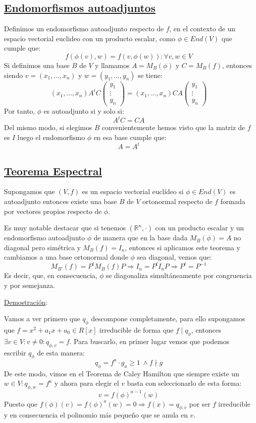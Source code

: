 \documentclass[10pt,a4paper,openright]{book}
\begin{document}
\subsection*{\underline{Endomorfismos autoadjuntos}}
Definimos un endomorfismo autoadjunto respecto de $f$, en el contexto de un espacio vectorial euclideo con un producto escalar, como $\phi\in End(V)$ que cumple que:
$$f(\phi(v),w) = f(v,\phi(w)): \forall v,w\in V$$
Si definimos una base $B$ de $V$ y llamamos $A=M_B(\phi)$ y $C=M_B(f)$, entonces siendo $v=(x_1, ..., x_n)$ y $w=(y_1, ..., y_n)$ se tiene:
$$(x_1, ..., x_n) A^tC \begin{pmatrix} y_1 \\ \vdots \\ y_n\end{pmatrix} = (x_1, ..., x_n)CA\begin{pmatrix} y_1 \\ \vdots \\ y_n\end{pmatrix}$$
Por tanto, $\phi$ es autoadjunto si y solo si:
$$A^tC=CA$$
Del mismo modo, si elegimos $B$ convenientemente hemos visto que la matriz de $f$ es $I$ luego el endomorfismo $\phi$ en esa base cumple que:
$$A=A^t$$

\subsection*{\underline{Teorema Espectral}}
Supongamos que $(V,f)$ es un espacio vectorial euclídeo si $\phi\in End(V)$ es autoadjunto entonces existe una base $B$ de $V$ ortonormal respecto de $f$ formada por vectores propios respecto de $\phi$.

Es muy notable destacar que si tenemos $(\mathbb R^n, \cdot)$ con un producto escalar y un endomorfismo autoadjunto $\phi$ de manera que en la base dada $M_B(\phi) = A$ no diagonal pero simétrica y $M_B(f) = I_n$, entonces si aplicamos este teorema y cambiamos a una base ortonormal donde $\phi$ sea diagonal, vemos que:
$$M_{B'}(f) = P^t M_B(f) P \Rightarrow I_n = P^t I_n P\Rightarrow P^t =P^{-1}$$
Es decir, que, en consecuencia, $\phi$ se diagonaliza simultáneamente por congruencia y por semejanza.

\underline{Demostración}:

Vamos a ver primero que $q_\phi$ descompone completamente, para ello supongamos que $f = x^2+a_1x+a_0\in R[x]$ irreducible de forma que $f\mid q_\phi$, entonces $\exists v\in V: v\neq 0: q_{\phi,v} = f$. Para buscarlo, en primer lugar vemos que podemos escribir $q_\phi$ de esta manera:
$$q_\phi = f^a \cdot g_ a\geq 1 \ \wedge f\nmid g$$
De este modo, vimos en el Teorema de Caley Hamilton que siempre existe un $w\in V: q_{\phi, w} = f^a$ y ahora para elegir el $v$ basta con seleccionarlo de esta forma:
$$v= f(\phi)^{a-1}(w)$$
Puesto que $f(\phi)(v) = f(\phi)^a(w) = 0\Rightarrow f(x) = q_{\phi,v}$ por ser $f$ irreducible y en consecuencia el polinomio más pequeño que se anula en $v$.
\end{document}
